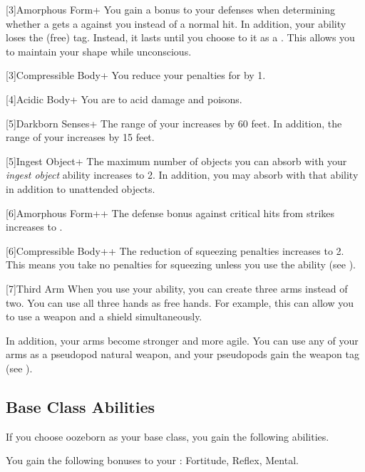         [3]{Amorphous Form+} You gain a  bonus to your defenses when determining whether a  gets a  against you instead of a normal hit.
        In addition, your  ability loses the  (free) tag.
        Instead, it lasts until you choose to  it as a .
        This allows you to maintain your shape while unconscious.

        [3]{Compressible Body+} You reduce your penalties for \squeezing by 1.

        [4]{Acidic Body+} You are  to acid damage and poisons.

        [5]{Darkborn Senses+} The range of your  increases by 60 feet.
        In addition, the range of your  increases by 15 feet.

        [5]{Ingest Object+} The maximum number of objects you can absorb with your \textit{ingest object} ability increases to 2.
        In addition, you may absorb  with that ability in addition to unattended objects.

        [6]{Amorphous Form++} The defense bonus against critical hits from strikes increases to .

        [6]{Compressible Body++} The reduction of squeezing penalties increases to 2.
        This means you take no penalties for squeezing unless you use the  ability (see ).

        [7]{Third Arm} When you use your  ability, you can create three arms instead of two.
        You can use all three hands as free hands.
        For example, this can allow you to use a  weapon and a shield simultaneously.

        In addition, your arms become stronger and more agile.
        You can use any of your arms as a pseudopod natural weapon, and your pseudopods gain the  weapon tag (see ).

    \subsection{Base Class Abilities}
        If you choose oozeborn as your base class, you gain the following abilities.

        You gain the following bonuses to your :  Fortitude,  Reflex,  Mental.

